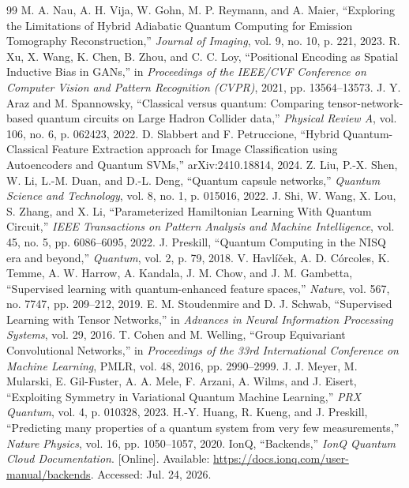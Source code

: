 \documentclass[sn-mathphys,Numbered]{sn-jnl}
\begin{document}
\begin{thebibliography}{99}
 M. A. Nau, A. H. Vija, W. Gohn, M. P. Reymann, and A. Maier, ``Exploring the Limitations of Hybrid Adiabatic Quantum Computing for Emission Tomography Reconstruction,'' \textit{Journal of Imaging}, vol. 9, no. 10, p. 221, 2023.
 R. Xu, X. Wang, K. Chen, B. Zhou, and C. C. Loy, ``Positional Encoding as Spatial Inductive Bias in GANs,'' in \textit{Proceedings of the IEEE/CVF Conference on Computer Vision and Pattern Recognition (CVPR)}, 2021, pp. 13564--13573.
 J. Y. Araz and M. Spannowsky, ``Classical versus quantum: Comparing tensor-network-based quantum circuits on Large Hadron Collider data,'' \textit{Physical Review A}, vol. 106, no. 6, p. 062423, 2022.
 D. Slabbert and F. Petruccione, ``Hybrid Quantum-Classical Feature Extraction approach for Image Classification using Autoencoders and Quantum SVMs,'' arXiv:2410.18814, 2024.
 Z. Liu, P.-X. Shen, W. Li, L.-M. Duan, and D.-L. Deng, ``Quantum capsule networks,'' \textit{Quantum Science and Technology}, vol. 8, no. 1, p. 015016, 2022.
 J. Shi, W. Wang, X. Lou, S. Zhang, and X. Li, ``Parameterized Hamiltonian Learning With Quantum Circuit,'' \textit{IEEE Transactions on Pattern Analysis and Machine Intelligence}, vol. 45, no. 5, pp. 6086--6095, 2022.
 J. Preskill, ``Quantum Computing in the NISQ era and beyond,'' \textit{Quantum}, vol. 2, p. 79, 2018.
 V. Havl{\'i}{\v c}ek, A. D. C{\'o}rcoles, K. Temme, A. W. Harrow, A. Kandala, J. M. Chow, and J. M. Gambetta, ``Supervised learning with quantum-enhanced feature spaces,'' \textit{Nature}, vol. 567, no. 7747, pp. 209--212, 2019.
 E. M. Stoudenmire and D. J. Schwab, ``Supervised Learning with Tensor Networks,'' in \textit{Advances in Neural Information Processing Systems}, vol. 29, 2016.
 T. Cohen and M. Welling, ``Group Equivariant Convolutional Networks,'' in \textit{Proceedings of the 33rd International Conference on Machine Learning}, PMLR, vol. 48, 2016, pp. 2990--2999.
 J. J. Meyer, M. Mularski, E. Gil-Fuster, A. A. Mele, F. Arzani, A. Wilms, and J. Eisert, ``Exploiting Symmetry in Variational Quantum Machine Learning,'' \textit{PRX Quantum}, vol. 4, p. 010328, 2023.
 H.-Y. Huang, R. Kueng, and J. Preskill, ``Predicting many properties of a quantum system from very few measurements,'' \textit{Nature Physics}, vol. 16, pp. 1050--1057, 2020.
 IonQ, ``Backends,'' \textit{IonQ Quantum Cloud Documentation}. [Online]. Available: \url{https://docs.ionq.com/user-manual/backends}. Accessed: Jul. 24, 2026.

\end{thebibliography}
\end{document}
